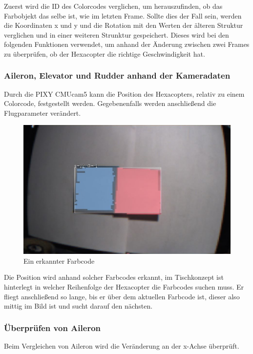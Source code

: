     Zuerst wird die ID des Colorcodes verglichen, um herauszufinden, ob das Farbobjekt das selbe ist, wie im letzten Frame.
    Sollte dies der Fall sein, werden die Koordinaten x und y und die Rotation mit den Werten der älteren Struktur verglichen und in einer weiteren Strunktur gespeichert. Dieses wird bei den folgenden Funktionen verwendet, um anhand der Änderung zwischen zwei Frames zu überprüfen, ob der Hexacopter die richtige Geschwindigkeit hat.

    \subsubsection{Aileron, Elevator und Rudder anhand der Kameradaten}
    Durch die PIXY CMUcam5 kann die Position des Hexacopters, relativ zu einem Colorcode, festgestellt werden. Gegebenenfalls werden anschließend die Flugparameter verändert.

    \begin{figure} [H]
      \begin{centering}
        \includegraphics[width = \textwidth]{Bilder/Farbcode_erkannt}
      \par\end{centering}
      \caption{Ein erkannter Farbcode}
      \label{Farbcode_erkannt}
    \end{figure}
    Die Position wird anhand solcher Farbcodes erkannt, im Tischkonzept ist hinterlegt in welcher Reihenfolge der Hexacopter die Farbcodes suchen muss.
    Er fliegt anschließend so lange, bis er über dem aktuellen Farbcode ist, dieser also mittig im Bild ist und sucht darauf den nächsten.

    \subsubsection{Überprüfen von Aileron}
    Beim Vergleichen von Aileron wird die Veränderung an der x-Achse überprüft.

